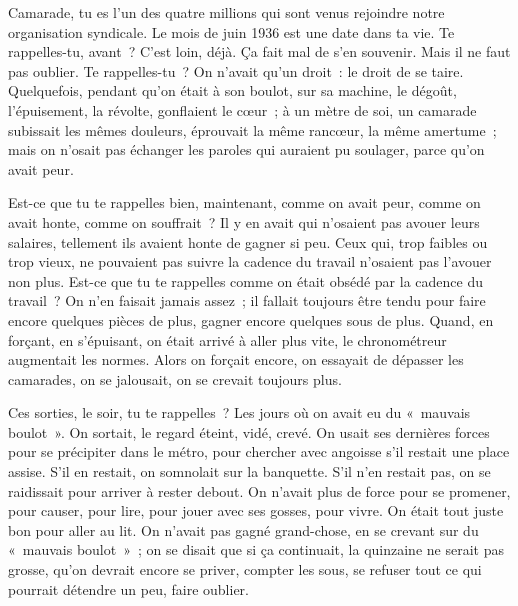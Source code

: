 \documentclass[french,twoside]{book} %
\begin{document}
\noindent Camarade, tu es l'un des quatre millions qui sont venus rejoindre notre organisation syndicale. Le mois de juin 1936 est une date dans ta vie. Te rappelles-tu, avant ? C'est loin, déjà. Ça fait mal de s'en souvenir. Mais il ne faut pas oublier. Te rappelles-tu ? On n'avait qu'un droit : le droit de se taire. Quelquefois, pendant qu'on était à son boulot, sur sa machine, le dégoût, l'épuisement, la révolte, gonflaient le cœur ; à un mètre de soi, un camarade subissait les mêmes douleurs, éprouvait la même rancœur, la même amertume ; mais on n'osait pas échanger les paroles qui auraient pu soulager, parce qu'on avait peur.\par
Est-ce que tu te rappelles bien, maintenant, comme on avait peur, comme on avait honte, comme on souffrait ? Il y en avait qui n'osaient pas avouer leurs salaires, tellement ils avaient honte de gagner si peu. Ceux qui, trop faibles ou trop vieux, ne pouvaient pas suivre la cadence du travail n'osaient pas l'avouer non plus. Est-ce que tu te rappelles comme on était obsédé par la cadence du travail ? On n'en faisait jamais assez ; il fallait toujours être tendu pour faire encore quelques pièces de plus, gagner encore quelques sous de plus. Quand, en forçant, en s'épuisant, on était arrivé à aller plus vite, le chronométreur augmentait les normes. Alors on forçait encore, on essayait de dépasser les camarades, on se jalousait, on se crevait toujours plus.\par
Ces sorties, le soir, tu te rappelles ? Les jours où on avait eu du « mauvais boulot ». On sortait, le regard éteint, vidé, crevé. On usait ses dernières forces pour se précipiter dans le métro, pour chercher avec angoisse s'il restait une place assise. S’il en restait, on somnolait sur la banquette. S'il n'en restait pas, on se raidissait pour arriver à rester debout. On n'avait plus de force pour se promener, pour causer, pour lire, pour jouer avec ses gosses, pour vivre. On était tout juste bon pour aller au lit. On n'avait pas gagné grand-chose, en se crevant sur du « mauvais boulot » ; on se disait que si ça continuait, la quinzaine ne serait pas grosse, qu'on devrait encore se priver, compter les sous, se refuser tout ce qui pourrait détendre un peu, faire oublier.\par
\end{document}
